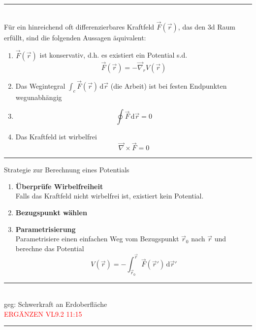 \documentclass{article}
\newcommand{\diff}{\mathrm{d}}
\begin{document}
\hrule
{}\\
Für ein hinreichend oft differenzierbares Kraftfeld $\vec{F}(\vec{r})$, das den 3d Raum erfüllt, sind die folgenden Aussagen äquivalent:
	\begin{enumerate}
		\item $\vec{F}(\vec{r})$ ist konservativ, d.h. es existiert ein Potential s.d.
			\begin{equation}
				\vec{F}(\vec{r}) = -\vec{\nabla}_r V(\vec{r})
			\end{equation}
		
		\item Das Wegintegral $\int_c \vec{F}(\vec{r})\,\diff\vec{r}$ (die Arbeit) ist bei festen Endpunkten wegunabhängig
		
		\item 
			$$\oint \vec{F}\,\diff\vec{r} = 0$$
		
		\item Das Kraftfeld ist wirbelfrei
			$$\vec{\nabla} \times \vec{F} = 0$$
	\end{enumerate}
\hrule

\vspace{0.5cm}

Strategie zur Berechnung eines Potentials
\begin{enumerate}
	\item \textbf{Überprüfe Wirbelfreiheit}\\
	Falls das Kraftfeld nicht wirbelfrei ist, existiert kein Potential.
	
	\item \textbf{Bezugspunkt wählen}\\
	
	\item \textbf{Parametrisierung}\\
	Parametrisiere einen einfachen Weg vom Bezugspunkt $\vec{r}_0$ nach $\vec{r}$ und berechne das Potential
		\begin{equation}
			V(\vec{r}) = -\int_{\vec{r}_0}^{\vec{r}} \vec{F}(\vec{r}')\,\diff\vec{r}'
		\end{equation}
\end{enumerate}

\vspace{0.5cm}

{\color{blue}
\hrule
	\\
	geg: Schwerkraft an Erdoberfläche\\
	\textcolor{red}{ERGÄNZEN VL9.2 11:15}



\hrule
}
\end{document}
